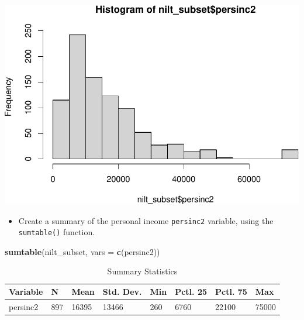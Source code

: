 \documentclass[
]{book}
\newenvironment{Shaded}{\begin{snugshade}}{\end{snugshade}}
\newcommand{\AttributeTok}[1]{\textcolor[rgb]{0.13,0.29,0.53}{#1}}
\newcommand{\FunctionTok}[1]{\textcolor[rgb]{0.13,0.29,0.53}{\textbf{#1}}}
\newcommand{\NormalTok}[1]{#1}
\newcommand{\SpecialCharTok}[1]{\textcolor[rgb]{0.81,0.36,0.00}{\textbf{#1}}}
\newcommand{\StringTok}[1]{\textcolor[rgb]{0.31,0.60,0.02}{#1}}
\providecommand{\tightlist}{%
  \setlength{\itemsep}{0pt}\setlength{\parskip}{0pt}}
\begin{document}
\begin{Shaded}
\end{Shaded}

\begin{flushleft}\includegraphics[width=1\linewidth]{lab-workbook_files/figure-latex/unnamed-chunk-122-1} \end{flushleft}

\begin{itemize}
\tightlist
\item
  Create a summary of the personal income \texttt{persinc2} variable, using the \texttt{sumtable()} function.
\end{itemize}

\begin{Shaded}
\begin{Highlighting}[]
\FunctionTok{sumtable}\NormalTok{(nilt\_subset, }\AttributeTok{vars =} \FunctionTok{c}\NormalTok{(}\StringTok{\textquotesingle{}persinc2\textquotesingle{}}\NormalTok{))}
\end{Highlighting}
\end{Shaded}

\begin{table}

\caption{\label{tab:unnamed-chunk-123}Summary Statistics}
\centering
\begin{tabular}[t]{llllllll}
\toprule
Variable & N & Mean & Std. Dev. & Min & Pctl. 25 & Pctl. 75 & Max\\
\midrule
persinc2 & 897 & 16395 & 13466 & 260 & 6760 & 22100 & 75000\\
\bottomrule
\end{tabular}
\end{table}
\end{document}
